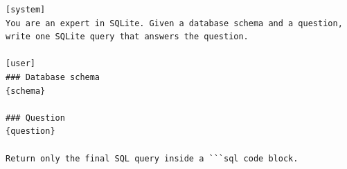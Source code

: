 \begin{lstlisting}
[system]
You are an expert in SQLite. Given a database schema and a question, write one SQLite query that answers the question.

[user]
### Database schema
{schema}

### Question
{question}

Return only the final SQL query inside a ```sql code block.
\end{lstlisting}
